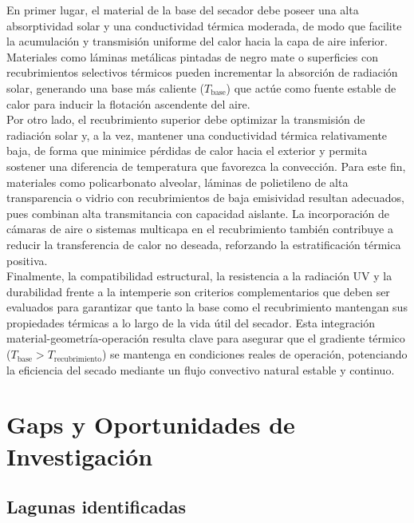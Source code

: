 \documentclass[12pt]{article}
\begin{document}
En primer lugar, el material de la base del secador debe poseer una alta absorptividad solar y una conductividad térmica moderada, de modo que facilite la acumulación y transmisión uniforme del calor hacia la capa de aire inferior. Materiales como láminas metálicas pintadas de negro mate o superficies con recubrimientos selectivos térmicos pueden incrementar la absorción de radiación solar, generando una base más caliente ($T_\text{base}$) que actúe como fuente estable de calor para inducir la flotación ascendente del aire.\\

Por otro lado, el recubrimiento superior debe optimizar la transmisión de radiación solar y, a la vez, mantener una conductividad térmica relativamente baja, de forma que minimice pérdidas de calor hacia el exterior y permita sostener una diferencia de temperatura que favorezca la convección. Para este fin, materiales como policarbonato alveolar, láminas de polietileno de alta transparencia o vidrio con recubrimientos de baja emisividad resultan adecuados, pues combinan alta transmitancia con capacidad aislante. La incorporación de cámaras de aire o sistemas multicapa en el recubrimiento también contribuye a reducir la transferencia de calor no deseada, reforzando la estratificación térmica positiva.\\

Finalmente, la compatibilidad estructural, la resistencia a la radiación UV y la durabilidad frente a la intemperie son criterios complementarios que deben ser evaluados para garantizar que tanto la base como el recubrimiento mantengan sus propiedades térmicas a lo largo de la vida útil del secador. Esta integración material-geometría-operación resulta clave para asegurar que el gradiente térmico ($T_\text{base} > T_\text{recubrimiento}$) se mantenga en condiciones reales de operación, potenciando la eficiencia del secado mediante un flujo convectivo natural estable y continuo.





\section{Gaps y Oportunidades de Investigación}
\subsection{Lagunas identificadas}
\end{document}

